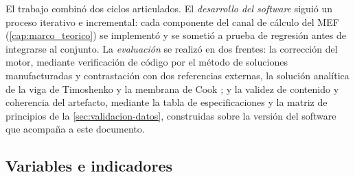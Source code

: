 El trabajo combinó dos ciclos articulados. El \emph{desarrollo del software} siguió un proceso iterativo e incremental: cada componente del canal de cálculo del MEF (\autoref{cap:marco_teorico}) se implementó y se sometió a prueba de regresión antes de integrarse al conjunto. La \emph{evaluación} se realizó en dos frentes: la corrección del motor, mediante verificación de código por el método de soluciones manufacturadas y contrastación con dos referencias externas, la solución analítica de la viga de Timoshenko y la membrana de Cook \autocite{oberkampf2010vv,salari2000mms}; y la validez de contenido y coherencia del artefacto, mediante la tabla de especificaciones y la matriz de principios de la \autoref{sec:validacion-datos}, construidas sobre la versión del software que acompaña a este documento.

\subsection{Variables e indicadores}
\label{sec:variables-met}

